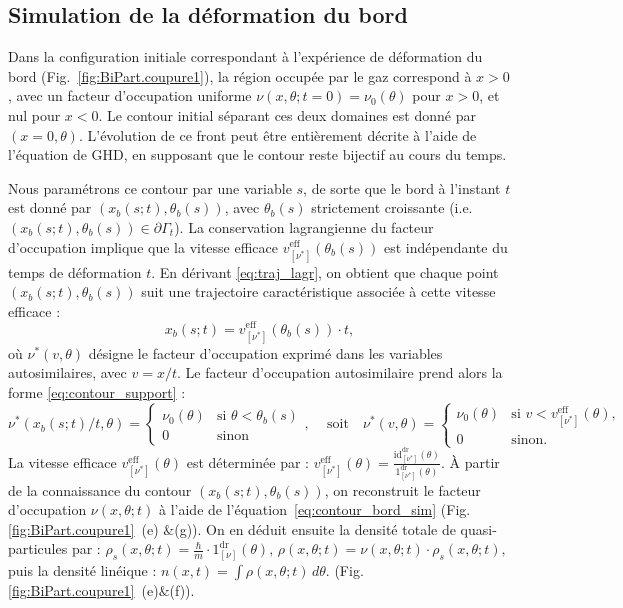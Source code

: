 \subsection{Simulation de la déformation du bord}

Dans la configuration initiale correspondant à l'expérience de déformation du bord (Fig.~\ref{fig:BiPart.coupure1}), la région occupée par le gaz correspond à \(x > 0\), avec un facteur d’occupation uniforme \(\nu(x,\theta; t=0) = \nu_0(\theta)\) pour \(x > 0\), et nul pour \(x < 0\). Le contour initial séparant ces deux domaines est donné par \((x = 0, \theta)\). L’évolution de ce front peut être entièrement décrite à l’aide de l’équation de GHD, en supposant que le contour reste bijectif au cours du temps.


Nous paramétrons ce contour par une variable \(s\), de sorte que le bord à l’instant \(t\) est donné par \((x_b(s;t), \theta_b(s))\), avec \(\theta_b(s)\) strictement croissante (i.e. \((x_b(s;t), \theta_b(s)) \in \partial \Gamma_t\)).  
La conservation lagrangienne du facteur d’occupation implique que la vitesse efficace \(v^{\mathrm{eff}}_{[\nu^\ast]}(\theta_b(s))\) est indépendante du temps de déformation \(t\).  
En dérivant \eqref{eq:traj_lagr}, on obtient que chaque point \((x_b(s;t), \theta_b(s))\) suit une trajectoire caractéristique associée à cette vitesse efficace :
\[
x_b(s;t) = v^{\mathrm{eff}}_{[\nu^\ast]}(\theta_b(s)) \cdot t,
\]
où \(\nu^\ast(v, \theta)\) désigne le facteur d’occupation exprimé dans les variables autosimilaires, avec \(v = x/t\).
Le facteur d’occupation autosimilaire prend alors la forme \eqref{eq:contour_support} :
\begin{equation}
\label{eq:contour_bord_sim}
\nu^\ast(x_b(s;t)/t,\theta)  =  	 \begin{cases} \nu_0(\theta) & \text{si }  \theta < \theta_b(s) \\ 0 & \text{sinon} \end{cases}, \, \quad \mbox{soit} \quad  	
\nu^\ast(v,\theta) = 
\begin{cases}
\nu_0(\theta) & \text{si }  v < v^{\mathrm{eff}}_{[\nu^\ast]}(\theta), \\
0 & \text{sinon} .
\end{cases}
\end{equation}
La vitesse efficace \(v^{\mathrm{eff}}_{[\nu^\ast]}(\theta)\) est déterminée par :
\(
v^{\mathrm{eff}}_{[\nu^\ast]}(\theta) = \frac{\mathrm{id}^{\mathrm{dr}}_{[\nu^\ast]}(\theta)}{\mathrm{1}^{\mathrm{dr}}_{[\nu^\ast]}(\theta)}.
\)
À partir de la connaissance du contour \((x_b(s;t), \theta_b(s))\), on reconstruit le facteur d’occupation \(\nu(x,\theta; t)\) à l’aide de l’équation~\eqref{eq:contour_bord_sim} (Fig. \ref{fig:BiPart.coupure1}~(e) $\&$(g)). On en déduit ensuite la densité totale de quasi-particules par :
\(
\rho_s(x,\theta;t) = \frac{\hbar}{m} \cdot 1^{\mathrm{dr}}_{[\nu]}(\theta),
\,
\rho(x,\theta;t) = \nu(x,\theta;t) \cdot \rho_s(x,\theta;t),
\)
puis la densité linéique :
\(
n(x,t) = \int \rho(x,\theta;t)\, d\theta.
\)
(Fig. \ref{fig:BiPart.coupure1}~(e)$\&$(f)).

